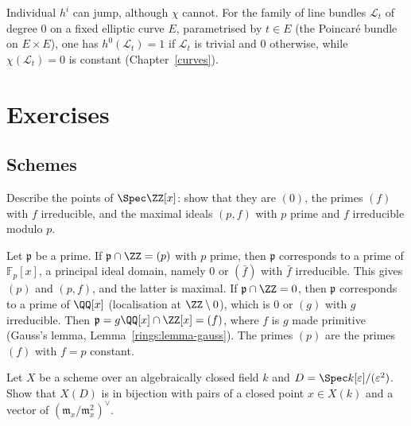 \begin{counterexample}\label{schemes:counterexample-jump}
Individual $h^i$ can jump, although $\chi$ cannot. For the family of line bundles $\mathcal{L}_t$ of degree $0$ on a fixed elliptic curve $E$, parametrised
by $t \in E$ (the Poincar\'e bundle on $E \times E$), one has $h^0(\mathcal{L}_t) = 1$ if $\mathcal{L}_t$ is trivial and $0$ otherwise, while
$\chi(\mathcal{L}_t) = 0$ is constant (Chapter~\ref{curves}).
\end{counterexample}

\section{Exercises}\label{schemes:section-exercises}

\subsection{Schemes}\label{schemes:subsection-exercises-schemes}

\begin{exercise}\label{schemes:exercise-spec-z-x}
Describe the points of $\Spec\ZZ[x]$: show that they are $(0)$, the primes $(f)$ with $f$ irreducible, and the maximal ideals $(p, f)$ with $p$ prime and
$f$ irreducible modulo $p$.
\end{exercise}

\begin{solution}
Let $\mathfrak{p}$ be a prime. If $\mathfrak{p} \cap \ZZ = (p)$ with $p$ prime, then $\mathfrak{p}$ corresponds to a prime of $\mathbb{F}_p[x]$, a principal ideal domain,
namely $0$ or $(\bar f)$ with $\bar f$ irreducible. This gives $(p)$ and $(p, f)$, and the latter is maximal. If $\mathfrak{p} \cap \ZZ = 0$, then $\mathfrak{p}$
corresponds to a prime of $\QQ[x]$ (localisation at $\ZZ \setminus 0$), which is $0$ or $(g)$ with $g$ irreducible. Then $\mathfrak{p} = g\QQ[x] \cap \ZZ[x] = (f)$,
where $f$ is $g$ made primitive (Gauss's lemma, Lemma~\ref{rings:lemma-gauss}). The primes $(p)$ are the primes $(f)$ with $f = p$ constant.
\end{solution}

\begin{exercise}\label{schemes:exercise-dual-numbers}
Let $X$ be a scheme over an algebraically closed field $k$ and $D = \Spec k[\varepsilon]/(\varepsilon^2)$. Show that $X(D)$ is in bijection with pairs of a closed
point $x \in X(k)$ and a vector of $(\mathfrak{m}_x/\mathfrak{m}_x^2)^\vee$.
\end{exercise}

